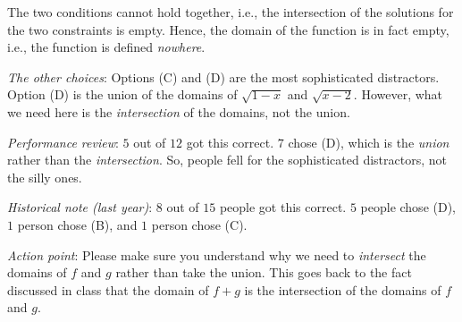 \documentclass[10pt]{amsart}
\begin{document}
\begin{enumerate}
  The two conditions cannot hold together, i.e., the intersection of
  the solutions for the two constraints is empty. Hence, the domain of
  the function is in fact empty, i.e., the function is defined {\em
  nowhere}.

  {\em The other choices}: Options (C) and (D) are the most
  sophisticated distractors. Option (D) is the union of the domains of
  $\sqrt{1 - x}$ and $\sqrt{x - 2}$. However, what we need here is the
  {\em intersection} of the domains, not the union.

  {\em Performance review}: $5$ out of $12$ got this correct. $7$
  chose (D), which is the {\em union} rather than the {\em
  intersection}. So, people fell for the sophisticated distractors,
  not the silly ones.

  {\em Historical note (last year)}: $8$ out of $15$ people got this
  correct. $5$ people chose (D), $1$ person chose (B), and $1$ person
  chose (C).

  {\em Action point}: Please make sure you understand why we need to
  {\em intersect} the domains of $f$ and $g$ rather than take the
  union. This goes back to the fact discussed in class that the domain
  of $f + g$ is the intersection of the domains of $f$ and $g$.

\end{enumerate}
\end{document}
